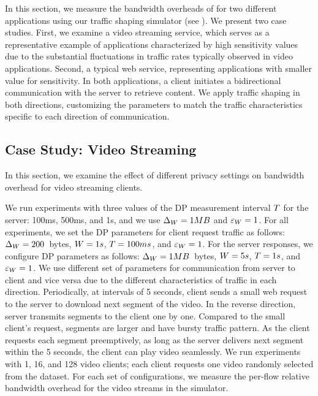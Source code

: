 In this section, we measure the bandwidth overheads of {\sys} for two different applications using our traffic shaping simulator (see ).
We present two case studies. 
First, we examine a video streaming service, which serves as a representative example of applications characterized by high sensitivity values due to the substantial fluctuations in traffic rates typically observed in video applications.
Second, a typical web service, representing applications with smaller value for sensitivity.
In both applications, a client initiates a bidirectional communication with the server to retrieve content.
We apply traffic shaping in both directions, customizing the parameters to match the traffic characteristics specific to each direction of communication.


\subsection{Case Study: Video Streaming}\label{subsec:eval-bw-video}
In this section, we examine the effect of different privacy settings on bandwidth overhead for video streaming clients.

We run experiments with three values of the DP measurement interval $T$ for the server:
100ms, 500ms, and 1s, and we use $\Delta_{W} = 1 MB$ and $\varepsilon_{W} = 1$.
For all experiments, we set the DP parameters for client request traffic as follows: $\Delta_{W} = 200$~bytes, $W = 1s$, $T = 100ms$, and $\varepsilon_{W} = 1$.
For the server responses, we configure DP parameters as follows: $\Delta_{W} = 1 MB$~bytes, $W = 5s$, $T = 1 s$, and $\varepsilon_{W} = 1$.
We use different set of parameters for communication from server to client and vice versa due to the different characteristics of traffic in each direction.
Periodically, at intervals of 5 seconds, client sends a small web request  to the server to download next segment of the video. 
In the reverse direction, server transmits segments to the client one by one.
Compared to the small client's request, segments are larger and have bursty traffic pattern.
As the client requests each segment preemptively, as long as the server delivers next segment within the 5 seconds, the client can play video seamlessly. 
We run experiments with 1, 16, and 128 video clients; each client requests one video randomly selected from the dataset.
For each set of configurations, we measure the per-flow relative bandwidth overhead for the video streams in the simulator.


